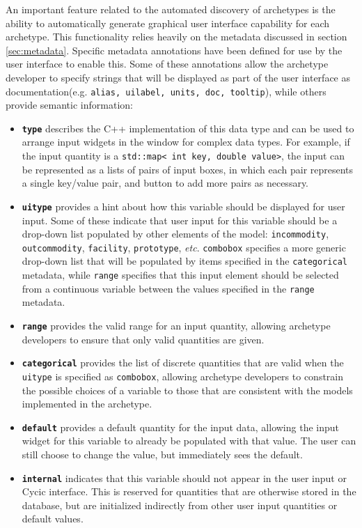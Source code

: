 An important feature related to the automated discovery of archetypes is the
ability to automatically generate graphical user interface capability for each
archetype.  This functionality relies heavily on the metadata discussed in
section \ref{sec:metadata}.  Specific metadata annotations have been defined
for use by the user interface to enable this.  Some of these annotations allow
the archetype developer to specify strings that will be displayed as part of
the user interface as documentation(e.g. \texttt{alias, uilabel, units, doc,
  tooltip}), while others provide semantic information:
\begin{itemize}
\item \textbf{\texttt{type}} describes the C++ implementation of this data
  type and can be used to arrange input widgets in the window for complex data
  types.  For example, if the input quantity is a \texttt{std::map< int key,
    double value>}, the input can be represented as a lists of pairs of input
  boxes, in which each pair represents a single key/value pair, and button to
  add more pairs as necessary.
\item \textbf{\texttt{uitype}} provides a hint about how this variable should
  be displayed for user input.  Some of these indicate that user input for
  this variable should be a drop-down list populated by other elements of the
  model: \texttt{incommodity}, \texttt{outcommodity}, \texttt{facility},
  \texttt{prototype}, \emph{etc}.  \texttt{combobox} specifies a more generic
  drop-down list that will be populated by items specified in the
  \texttt{categorical} metadata, while \texttt{range} specifies that this
  input element should be selected from a continuous variable between the
  values specified in the \texttt{range} metadata.
\item \textbf{\texttt{range}} provides the valid range for an input quantity,
  allowing archetype developers to ensure that only valid quantities are
  given.
\item \textbf{\texttt{categorical}} provides the list of discrete quantities
  that are valid when the \texttt{uitype} is specified as \texttt{combobox},
  allowing archetype developers to constrain the possible choices of a
  variable to those that are consistent with the models implemented in the
  archetype.
\item \textbf{\texttt{default}} provides a default quantity for the input
  data, allowing the input widget for this variable to already be populated
  with that value.  The user can still choose to change the value, but
  immediately sees the default.
\item \textbf{\texttt{internal}} indicates that this variable should not appear
  in the user input or Cycic interface.  This is reserved for quantities that
  are otherwise stored in the database, but are initialized indirectly from
  other user input quantities or default values.
\end{itemize}


